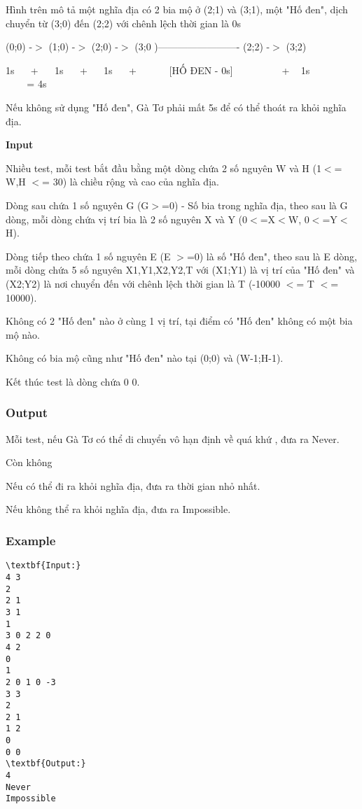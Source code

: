 Hình trên mô tả một nghĩa địa có 2 bia mộ ở (2;1) và (3;1), một "Hố đen", dịch chuyển từ (3;0) đến (2;2) với chênh lệch thời gian là 0s

(0;0) -$>$ (1;0) -$>$ (2;0) -$>$ (3;0 )------------------------- (2;2) -$>$ (3;2)

1s    +    1s    +    1s    +        [HỐ ĐEN - 0s]            +   1s                = 4s

Nếu không sử dụng "Hố đen", Gà Tơ phải mất 5s để có thể thoát ra khỏi nghĩa địa.

\textbf{Input }

Nhiều test, mỗi test bắt đầu bằng một dòng chứa 2 số nguyên W và H (1$<$= W,H $<$= 30) là chiều rộng và cao của nghĩa địa.

Dòng sau chứa 1 số nguyên G (G$>$=0) - Số bia trong nghĩa địa, theo sau là G dòng, mỗi dòng chứa vị trí bia là 2 số nguyên X và Y (0$<$=X$<$W, 0$<$=Y$<$H).

Dòng tiếp theo chứa 1 số nguyên E (E $>$=0) là số "Hố đen", theo sau là E dòng, mỗi dòng chứa 5 số nguyên X1,Y1,X2,Y2,T với (X1;Y1) là vị trí của "Hố đen" và (X2;Y2) là nơi chuyển đến với chênh lệch thời gian là T (-10000 $<$= T $<$= 10000).

Không có 2 "Hố đen" nào ở cùng 1 vị trí, tại điểm có "Hố đen" không có một bia mộ nào.

Không có bia mộ cũng như "Hố đen" nào tại (0;0) và (W-1;H-1).

Kết thúc test là dòng chứa 0 0.

\subsubsection{Output}

Mỗi test, nếu Gà Tơ có thể di chuyển vô hạn định về quá khứ , đưa ra Never.

Còn không

Nếu có thể đi ra khỏi nghĩa địa, đưa ra thời gian nhỏ nhất.

Nếu không thể ra khỏi nghĩa địa, đưa ra Impossible.

\subsubsection{Example}
\begin{verbatim}
\textbf{Input:}
4 3
2
2 1
3 1
1
3 0 2 2 0
4 2
0
1
2 0 1 0 -3
3 3
2
2 1
1 2
0
0 0
\textbf{Output:}
4
Never
Impossible\end{verbatim}